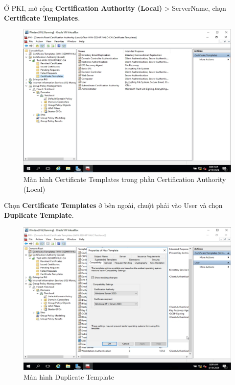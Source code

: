 \newpage

 Ở PKI, mở rộng \textbf{Certification Authority (Local)} > ServerName, chọn \textbf{Certificate Templates}.

\begin{figure}[!htb]
    \centering
    \includegraphics[width=0.9\linewidth]{figure//chapter4//lab4_3/cert_temp_in_auth.png}
    \caption{Màn hình Certificate Templates trong phần Certification Authority (Local)}
    \label{fig:enter-label}
\end{figure}

 Chọn \textbf{Certificate Templates} ở bên ngoài, chuột phải vào User và chọn \textbf{Duplicate Template}.

\begin{figure}[!htb]
    \centering
    \includegraphics[width=0.9\linewidth]{figure//chapter4//lab4_3/duplicate_template.png}
    \caption{Màn hình Duplicate Template}
    \label{fig:enter-label}
\end{figure}

